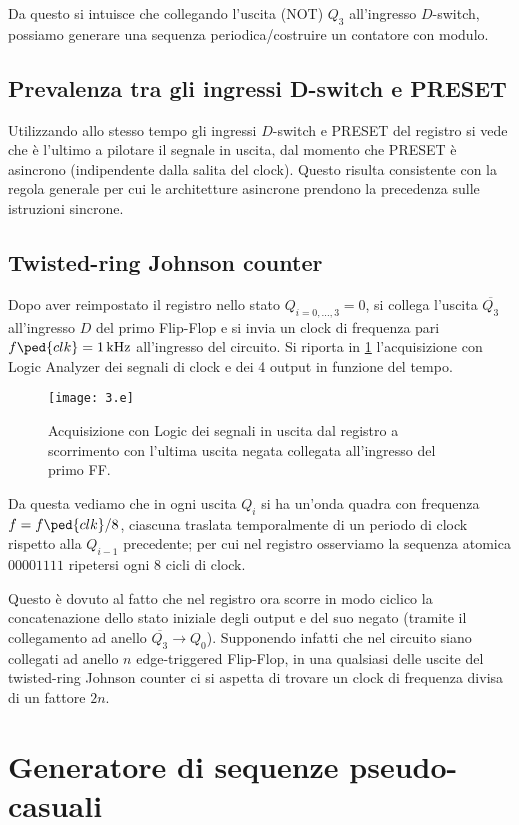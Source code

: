 \documentclass[10pt, a4paper, italian]{article}
\begin{document}
Da questo si intuisce che collegando l'uscita (NOT) $Q_3$ all'ingresso
$D$-switch, possiamo generare una sequenza periodica/costruire un contatore
con modulo.

\subsection{Prevalenza tra gli ingressi D-switch e PRESET}
Utilizzando allo stesso tempo gli ingressi $D$-switch e PRESET del registro
si vede che è l'ultimo a pilotare il segnale in uscita, dal momento che PRESET
è asincrono (indipendente dalla salita del clock). Questo risulta consistente
con la regola generale per cui le architetture asincrone prendono la precedenza
sulle istruzioni sincrone. 

\subsection{Twisted-ring Johnson counter}
Dopo aver reimpostato il registro nello stato $Q_{i=0,\ldots, 3} = 0$, si
collega l'uscita $\overline{Q_3}$ all'ingresso $D$ del primo Flip-Flop e si
invia un clock di frequenza pari $f\ped{clk} = \SI{1}{k\Hz}$ all'ingresso del
circuito. Si riporta in \cref{fig: Shift_reg_seq} l'acquisizione con Logic
Analyzer dei segnali di clock e dei 4 output in funzione del tempo.
\begin{figure}[htbp]
\centering
	\texttt{[image: 3.e]}
	\caption{Acquisizione con Logic dei segnali in uscita dal registro a
	scorrimento con l'ultima uscita negata collegata all'ingresso del primo FF.
	\label{fig: Shift_reg_seq}}
\end{figure}

Da questa vediamo che in ogni uscita $Q_i$ si ha un'onda quadra con frequenza
$f = f\ped{clk}/8$, ciascuna traslata temporalmente di un periodo di clock
rispetto alla $Q_{i-1}$ precedente; per cui nel registro osserviamo la
sequenza atomica $00001111$ ripetersi ogni $8$ cicli di clock.

Questo è dovuto al fatto che nel registro ora scorre in modo ciclico la
concatenazione dello stato iniziale degli output e del suo negato (tramite
il collegamento ad anello $\overline{Q_3} \to Q_0$).
Supponendo infatti che nel circuito siano collegati ad anello $n$
edge-triggered Flip-Flop, in una qualsiasi delle uscite del twisted-ring
Johnson counter ci si aspetta di trovare un clock di frequenza divisa di un
fattore $2n$.

\section{Generatore di sequenze pseudo-casuali}
\end{document}
